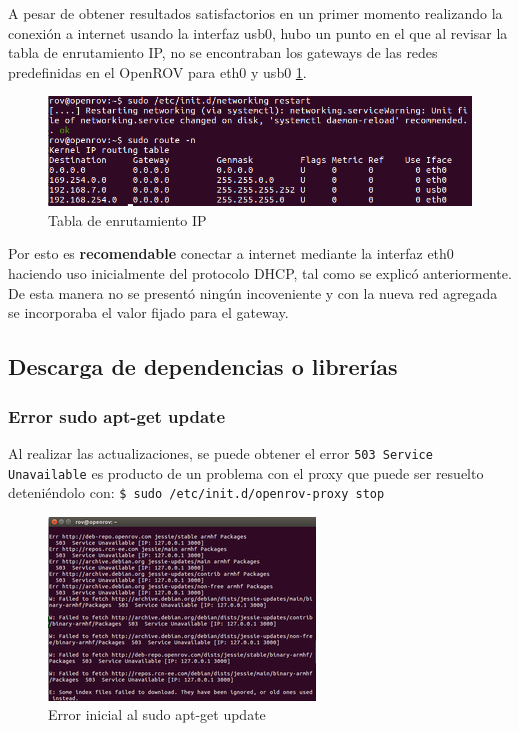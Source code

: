 \par A pesar de obtener resultados satisfactorios en un primer momento realizando la conexión a internet usando la interfaz usb0, hubo un punto en el que al revisar la tabla de enrutamiento IP, no se encontraban los gateways de las redes predefinidas en el OpenROV para eth0 y usb0 \ref{fig:routeIP}.

\begin{figure}[H]
    \centering
    \includegraphics[scale=0.6]{partes/ImgSophia/Apendice/IProutetable.png}
    \caption{Tabla de enrutamiento IP}
    \label{fig:routeIP}
\end{figure}

\par Por esto es \textbf{recomendable} conectar a internet mediante la interfaz eth0 haciendo uso inicialmente del protocolo DHCP, tal como se explicó anteriormente. De esta manera no se presentó ningún incoveniente y con la nueva red agregada se incorporaba el valor fijado para el gateway. 

\subsection{Descarga de dependencias o librerías}

\subsubsection{Error sudo apt-get update}

Al realizar las actualizaciones, se puede obtener el error \verb|503 Service Unavailable| es producto de un problema con el proxy que puede ser resuelto deteniéndolo con: 
\verb|$ sudo /etc/init.d/openrov-proxy stop|

\begin{figure}[H]
    \centering
    \includegraphics[scale=1.2]{partes/ImgSophia/Apendice/error503.png}
    \caption{Error inicial al sudo apt-get update}
    \label{fig:ErrSudoApt}
\end{figure}

